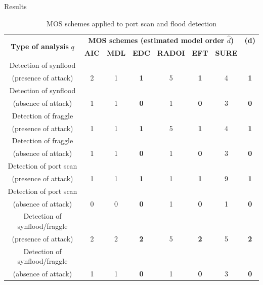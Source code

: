 \documentclass[newPxFont, numfooter, sectionpages]{beamer}
\begin{document}
\begin{frame}{Results}
	
	\begin{table}[h!]
	  \centering
	  \caption{MOS schemes applied to port scan and flood detection}
	  \label{tab:tab4}
	  \begin{tabular}{ c c c c c c c c }
		\toprule
		\multirow{2}{*}{\textbf{Type of analysis} $q$} &\multicolumn{6}{c}{\textbf{MOS schemes (estimated model order $\hat{d}$)}} &{\textbf{(d)}}\\ 
				\hhline{~------~}
			&\textbf{AIC} &\textbf{MDL} &\textbf{EDC} &\textbf{RADOI} &\textbf{EFT} &\textbf{SURE}\\
		\midrule
		Detection of synflood \\(presence of attack) &2 &1 &\textbf{1} &5 &\textbf{1} &4 &\textbf{1} \\
		Detection of synflood \\(absence of attack) &1 &1 &\textbf{0} &1 &\textbf{0} &3 &\textbf{0} \\
		\midrule
		Detection of fraggle \\(presence of attack) &1 &1 &\textbf{1} &5 &\textbf{1} &4 &\textbf{1} \\
		Detection of fraggle \\(absence of attack) &1 &1 &\textbf{0} &1 &\textbf{0} &3 &\textbf{0} \\
		\midrule
		Detection of port scan \\(presence of attack) &1 &1 &\textbf{1} &1 &\textbf{1} &9 &\textbf{1} \\
		Detection of port scan \\(absence of attack) &0 &0 &\textbf{0} &1 &\textbf{0} &1 &\textbf{0} \\
		\midrule
		Detection of synflood/fraggle \\(presence of attack) &2 &2 &\textbf{2} &5 &\textbf{2} &5 &\textbf{2} \\
		Detection of synflood/fraggle \\(absence of attack) &1 &1 &\textbf{0} &1 &\textbf{0} &3 &\textbf{0} \\
	    \bottomrule
	  \end{tabular}
	\end{table}

\end{frame}
\end{document}
